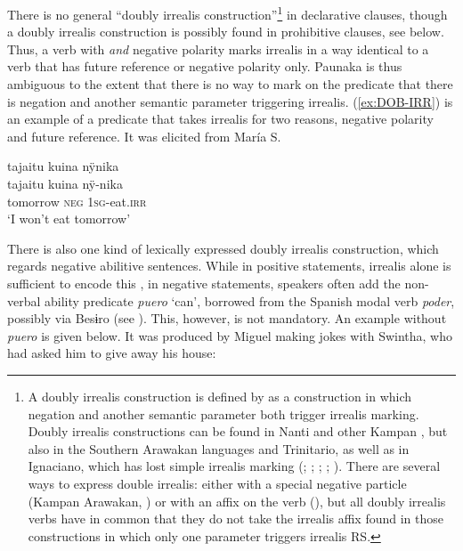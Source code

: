 There is no general “doubly irrealis construction”\footnote{A doubly irrealis construction is defined by \citet[271]{Michael2014} as a construction in which negation and another semantic parameter both trigger irrealis marking. Doubly irrealis constructions can be found in Nanti and other Kampan , but also in the Southern Arawakan languages  and Trinitario, as well as in Ignaciano, which has lost simple irrealis marking (\citealp[cf.][268]{EkdahlGrimes1964}; \citealt[132]{OlzaZubiri2004}; \citealt[279]{Michael2014}; \citealt[235]{Rose2014}; \citealt[108, 115]{DanielsenTerhartSubm}). There are several ways to express double irrealis: either with a special negative particle (Kampan Arawakan, ) or with an affix on the verb (), but all doubly irrealis verbs have in common that they do not take the irrealis affix found in those constructions in which only one parameter triggers irrealis RS.} in declarative clauses, though a doubly irrealis construction is possibly found in prohibitive clauses, see  below. Thus, a verb with  \textit{and} negative polarity marks irrealis in a way identical to a verb that has future reference or negative polarity only. Paunaka is thus ambiguous to the extent that there is no way to mark on the predicate that there is negation and another semantic parameter triggering irrealis. (\ref{ex:DOB-IRR}) is an example of a predicate that takes irrealis for two reasons, negative polarity and future reference. It was elicited from María S.

\ea\label{ex:DOB-IRR}
\begingl 
\glpreamble tajaitu kuina nÿnika\\
\gla tajaitu kuina nÿ-nika\\ 
\glb tomorrow \textsc{neg} 1\textsc{sg}-eat.\textsc{irr}\\ 
\glft ‘I won’t eat tomorrow’
 \trailingcitation{[rxx-e-151017l]}
\xe

\hspace*{-0.9pt}There is also one kind of lexically expressed doubly irrealis construction, which regards negative abilitive sentences. While in positive statements, irrealis alone is sufficient to encode this , in negative statements, speakers often add the non-verbal ability predicate \textit{puero} ‘can’, borrowed from the Spanish modal verb \textit{poder}, possibly via Besɨro (see ). This, however, is not mandatory. An example without \textit{puero} is given below. It was produced by Miguel making jokes with Swintha, who had asked him to give away his house:

